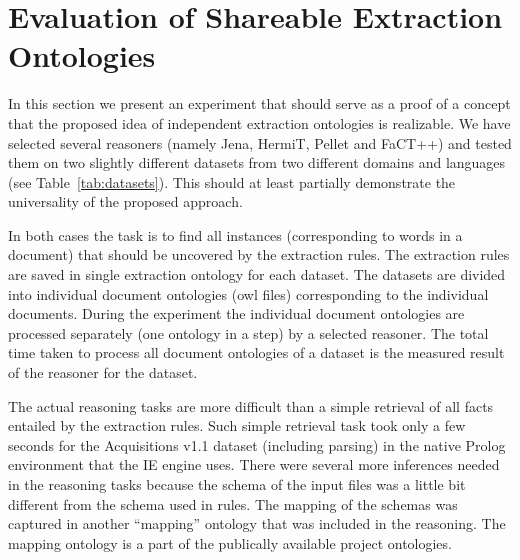 


\section{Evaluation of Shareable Extraction Ontologies}  \label{sec:onto_experiment}

In this section we present an experiment that should serve as a proof of a concept that the proposed idea of independent extraction ontologies is realizable. We have selected several reasoners (namely Jena, HermiT, Pellet and FaCT++) and tested them on two slightly different datasets from two different domains and languages (see Table~\ref{tab:datasets}). This should at least partially demonstrate the universality of the proposed approach.

In both cases the task is to find all instances (corresponding to words in a document) that should be uncovered by the extraction rules. The extraction rules are saved in single extraction ontology for each dataset. The datasets are divided into individual document ontologies (owl files) corresponding to the individual documents. During the experiment the individual document ontologies are processed separately (one ontology in a step) by a selected reasoner. The total time taken to process all document ontologies of a dataset is the measured result of the reasoner for the dataset.

The actual reasoning tasks are more difficult than a simple retrieval of all facts entailed by the extraction rules. Such simple retrieval task took only a few seconds for the Acquisitions v1.1 dataset (including parsing) in the native Prolog environment that the IE engine uses. There were several more inferences needed in the reasoning tasks because the schema of the input files was a little bit different from the schema used in rules. The mapping of the schemas was captured in another ``mapping'' ontology that was included in the reasoning. The mapping ontology is a part of the publically available project ontologies.


